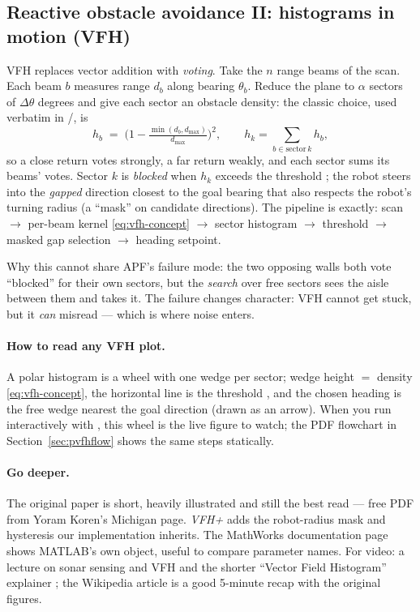\subsection{Reactive obstacle avoidance II: histograms in motion (VFH)}
\label{sec:concept-vfh}

VFH replaces vector addition with \emph{voting}. Take the $n$ range beams of
the scan. Each beam $b$ measures range $d_b$ along bearing $\theta_b$. Reduce
the plane to $\alpha$ sectors of $\Delta\theta$ degrees and give each sector
an obstacle density: the classic choice, used verbatim in
/, is
\begin{equation}
h_b \;=\; \Big(1-\tfrac{\min(d_b, d_{\max})}{d_{\max}}\Big)^2,
\qquad
h_k = \sum_{b \in \mathrm{sector}\,k} h_b,
\label{eq:vfh-concept}
\end{equation}
so a close return votes strongly, a far return weakly, and each sector sums
its beams' votes. Sector $k$ is \emph{blocked} when $h_k$ exceeds the
threshold ; the robot steers into the \emph{gapped} direction
closest to the goal bearing that also respects the robot's turning radius
(a ``mask'' on candidate directions). The pipeline is exactly:
scan $\to$ per-beam kernel \eqref{eq:vfh-concept} $\to$ sector histogram
$\to$ threshold $\to$ masked gap selection $\to$ heading setpoint.

Why this cannot share APF's failure mode: the two opposing walls both vote
``blocked'' for their own sectors, but the \emph{search} over free sectors
sees the aisle between them and takes it. The failure changes character: VFH
cannot get stuck, but it \emph{can} misread --- which is where noise enters.

\paragraph{How to read any VFH plot.} A polar histogram is a wheel with one
wedge per sector; wedge height $=$ density \eqref{eq:vfh-concept}, the
horizontal line is the threshold , and the chosen heading is the
free wedge nearest the goal direction (drawn as an arrow). When you run
 interactively with , this
wheel is the live figure to watch; the PDF flowchart in
Section~\ref{sec:pvfhflow} shows the same steps statically.

\paragraph{Go deeper.} The original paper \cite{borenstein1991} is short,
heavily illustrated and still the best read --- free PDF from Yoram Koren's
Michigan page. \emph{VFH+} \cite{ulrich1998} adds the robot-radius mask and
hysteresis our implementation inherits. The MathWorks documentation page
\cite{mwvfh} shows MATLAB's own  object, useful to compare
parameter names. For video: a lecture on sonar sensing and VFH
\cite{vfhvideo} and the shorter ``Vector Field Histogram'' explainer
\cite{vfhvideo2}; the Wikipedia article \cite{vfhwiki} is a good 5-minute
recap with the original figures.

